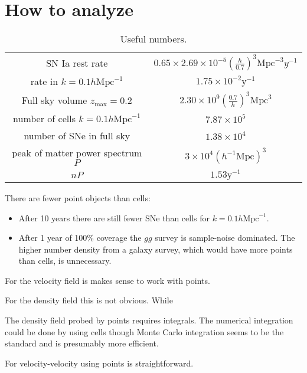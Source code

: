\documentclass{article}
\begin{document}
\newpage
\section{How to analyze}
\begin{table}[htbp]
   \centering
   \begin{tabular}{|c|c|} %
   	\hline
	SN Ia rest rate & $0.65 \times 2.69 \times 10^{-5} \left(\frac{h}{0.7}\right)^3 \text{Mpc}^{-3} y^{-1}$\\
	rate in $k=0.1 h \text{Mpc}^{-1}$ &$ 1.75 \times 10^{-2} \text{y}^{-1}$\\
	Full sky volume $z_{\text{max}}=0.2$ & $2.30 \times 10^{9} \left(\frac{0.7}{h}\right)^3 \text{Mpc}^3$\\
	number of cells $k=0.1 h \text{Mpc}^{-1}$   & $7.87 \times 10^5$\\
	number of SNe in full sky& $1.38 \times 10^4$ \\
	peak of matter power spectrum $P$ & $3 \times 10^4 (h^{-1} \text{Mpc})^3$\\
	$nP$ &$1.53 \mbox{y}^{-1}$ \\
	\hline
   \end{tabular}
   \caption{Useful numbers.}
   \label{tab:booktabs}
\end{table}

There are fewer point objects than cells:
\begin{itemize}
\item  After 10 years there are still fewer SNe than cells for $k=0.1 h \text{Mpc}^{-1}$. 
\item After 1 year of 100\% coverage the $gg$ survey is sample-noise dominated.  The higher number density from a
galaxy survey, which would have more points than cells, is unnecessary.
\end{itemize}

For the velocity field is makes sense to work with points.

For the density field this is not obvious.  While 

The density field probed by points requires integrals.  The numerical integration could be done by using cells though Monte Carlo integration seems to be the standard and 
is presumably more efficient.




For velocity-velocity using points is straightforward.
\end{document}
